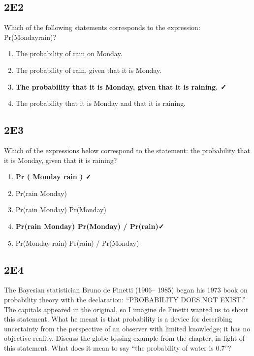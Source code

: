 \documentclass[
]{book}
\providecommand{\tightlist}{%
  \setlength{\itemsep}{0pt}\setlength{\parskip}{0pt}}
\begin{document}
\hypertarget{e2}{%
\subsection*{2E2}\label{e2}}

Which of the following statements corresponds to the expression: Pr(Monday\textbar rain)?

\begin{enumerate}
\def\labelenumi{\arabic{enumi}.}
\tightlist
\item
  The probability of rain on Monday.
\item
  The probability of rain, given that it is Monday.
\item
  \textbf{The probability that it is Monday, given that it is raining. ✓}
\item
  The probability that it is Monday and that it is raining.
\end{enumerate}

\hypertarget{e3}{%
\subsection*{2E3}\label{e3}}

Which of the expressions below correspond to the statement: the probability that it is Monday, given that it is raining?

\begin{enumerate}
\def\labelenumi{\arabic{enumi}.}
\tightlist
\item
  \textbf{Pr ( Monday \textbar{} rain ) ✓}
\item
  Pr(rain \textbar{} Monday)
\item
  Pr(rain \textbar{} Monday) Pr(Monday)
\item
  \textbf{Pr(rain \textbar{} Monday) Pr(Monday) / Pr(rain)✓}
\item
  Pr(Monday \textbar{} rain) Pr(rain) / Pr(Monday)
\end{enumerate}

\hypertarget{e4}{%
\subsection*{2E4}\label{e4}}

The Bayesian statistician Bruno de Finetti (1906-- 1985) began his 1973 book on probability theory with the declaration: ``PROBABILITY DOES NOT EXIST.'' The capitals appeared in the original, so I imagine de Finetti wanted us to shout this statement. What he meant is that probability is a device for describing uncertainty from the perspective of an observer with limited knowledge; it has no objective reality. Discuss the globe tossing example from the chapter, in light of this statement. What does it mean to say ``the probability of water is 0.7''?
\end{document}
